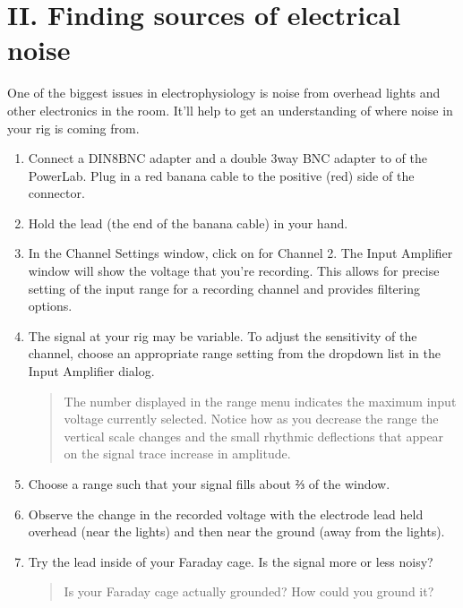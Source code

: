 \documentclass[letterpaper,10pt,english]{jupyterBook}
\begin{document}
\section{II. Finding sources of electrical noise}
\label{\detokenize{StringNervousSystems:ii-finding-sources-of-electrical-noise}}
\sphinxAtStartPar
One of the biggest issues in electrophysiology is noise from overhead lights and other electronics in the room. It’ll help to get an understanding of where noise in your rig is coming from.
\begin{enumerate}
%
\item {} 
\sphinxAtStartPar
Connect a DIN8\sphinxhyphen{}BNC adapter and a double 3\sphinxhyphen{}way BNC adapter to  of the PowerLab. Plug in a red banana cable to the positive (red) side of the connector.

\item {} 
\sphinxAtStartPar
Hold the lead (the end of the banana cable) in your hand.

\item {} 
\sphinxAtStartPar
In the Channel Settings window, click on  for Channel 2. The Input Amplifier window will show the voltage that you’re recording. This allows for precise setting of the input range for a recording channel and provides filtering options.

\item {} 
\sphinxAtStartPar
The signal at your rig may be variable. To adjust the sensitivity of the channel, choose an appropriate range setting from the  drop\sphinxhyphen{}down list in the Input Amplifier dialog.
\begin{quote}

\sphinxAtStartPar
{} The number displayed in the range menu indicates the maximum input voltage currently selected. Notice how as you decrease the range the vertical scale changes and the small rhythmic deflections that appear on the signal trace increase in amplitude.
\end{quote}

\item {} 
\sphinxAtStartPar
Choose a range such that your signal fills about ⅔ of the window.

\item {} 
\sphinxAtStartPar
Observe the change in the recorded voltage with the electrode lead held overhead (near the lights) and then near the ground (away from the lights).

\item {} 
\sphinxAtStartPar
Try the lead inside of your Faraday cage. Is the signal more or less noisy?
\begin{quote}

\sphinxAtStartPar
{} Is your Faraday cage actually grounded? How could you ground it?
\end{quote}

\end{enumerate}
\end{document}
